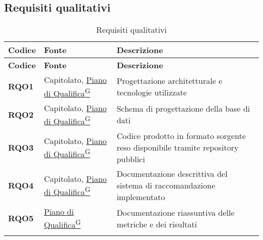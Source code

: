 \subsection{Requisiti qualitativi}
\begin{longtable}{|>{\centering\arraybackslash}m{}|>{\centering\arraybackslash}m{}|>{\centering\arraybackslash}m{}|}
	\hline
	\textbf{Codice} & \textbf{Fonte} & \textbf{Descrizione}\\\hline
	\endfirsthead
	\hline
	\textbf{Codice} & \textbf{Fonte} & \textbf{Descrizione}\\\hline
	\endhead
	\hline
	\textbf{RQO1} & Capitolato, \href{https://code7crusaders.github.io/docs/RTB/documentazione_interna/glossario.html#piano-di-qualifica}{Piano di Qualifica\textsuperscript{G}} & Progettazione architetturale e tecnologie utilizzate \\
	\hline
	\textbf{RQO2} & Capitolato, \href{https://code7crusaders.github.io/docs/RTB/documentazione_interna/glossario.html#piano-di-qualifica}{Piano di Qualifica\textsuperscript{G}} & Schema di progettazione della base di dati \\
	\hline
	\textbf{RQO3} & Capitolato, \href{https://code7crusaders.github.io/docs/RTB/documentazione_interna/glossario.html#piano-di-qualifica}{Piano di Qualifica\textsuperscript{G}} & Codice prodotto in formato sorgente reso disponibile tramite repository pubblici \\
	\hline
	\textbf{RQO4} & Capitolato, \href{https://code7crusaders.github.io/docs/RTB/documentazione_interna/glossario.html#piano-di-qualifica}{Piano di Qualifica\textsuperscript{G}} & Documentazione descrittiva del sistema di raccomandazione implementato\\
	\hline
	\textbf{RQO5} & \href{https://code7crusaders.github.io/docs/RTB/documentazione_interna/glossario.html#piano-di-qualifica}{Piano di Qualifica\textsuperscript{G}} & Documentazione riassuntiva delle metriche e dei risultati\\
	\hline
	\caption{Requisiti qualitativi}
\end{longtable}

\pagebreak
